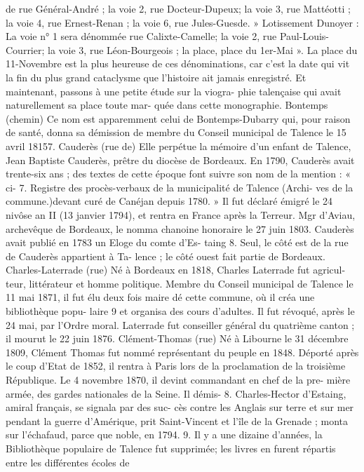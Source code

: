 \documentclass[a4paper,11pt]{book}
\begin{document}
de rue Général-André ; la voie 2, rue Docteur-Dupeux; la
voie 3, rue Mattéotti ; la voie 4, rue Ernest-Renan ; la voie
6, rue Jules-Guesde.
» Lotissement Dunoyer : La voie n° 1 sera dénommée
rue Calixte-Camelle; la voie 2, rue Paul-Louis-Courrier;
la voie 3, rue Léon-Bourgeois ; la place, place du 1er-Mai ».
La place du 11-Novembre est la plus heureuse de ces
dénominations, car c'est la date qui vit la fin du plus grand
cataclysme que l'histoire ait jamais enregistré.
Et maintenant, passons à une petite étude sur la viogra-
phie talençaise qui avait naturellement sa place toute mar-
quée dans cette monographie.
Bontemps (chemin)
Ce nom est apparemment celui de Bontemps-Dubarry
qui, pour raison de santé, donna sa démission de membre
du Conseil municipal de Talence le 15 avril 18157.
Cauderès (rue de)
Elle perpétue la mémoire d'un enfant de Talence, Jean
Baptiste Cauderès, prêtre du diocèse de Bordeaux.
En 1790, Cauderès avait trente-six ans ; des textes de
cette époque font suivre son nom de la mention : « ci-
7. Registre des procès-verbaux de la municipalité de Talence (Archi-
ves de la commune.)devant curé de Canéjan depuis 1780. » Il fut déclaré émigré
le 24 nivôse an II (13 janvier 1794), et rentra en France
après la Terreur. Mgr d'Aviau, archevêque de Bordeaux,
le nomma chanoine honoraire le 27 juin 1803.
Cauderès avait publié en 1783 un Eloge du comte d'Es-
taing 8.
Seul, le côté est de la rue de Cauderès appartient à Ta-
lence ; le côté ouest fait partie de Bordeaux.
Charles-Laterrade (rue)
Né à Bordeaux en 1818, Charles Laterrade fut agricul-
teur, littérateur et homme politique. Membre du Conseil
municipal de Talence le 11 mai 1871, il fut élu deux fois
maire dé cette commune, où il créa une bibliothèque popu-
laire 9 et organisa des cours d'adultes. Il fut révoqué, après
le 24 mai, par l'Ordre moral.
Laterrade fut conseiller général du quatrième canton ;
il mourut le 22 juin
1876.
Clément-Thomas (rue)
Né à Libourne le 31 décembre 1809, Clément Thomas fut
nommé représentant du peuple en 1848.
Déporté après le coup d'Etat de 1852, il rentra à Paris
lors de la proclamation de la troisième République. Le
4 novembre 1870, il devint commandant en chef de la pre-
mière armée, des gardes nationales de la Seine. Il démis-
8. Charles-Hector d'Estaing, amiral français, se signala par des suc-
cès contre les Anglais sur terre et sur mer pendant la guerre d'Amérique,
prit Saint-Vincent et l'île de la Grenade ; monta sur l'échafaud, parce que
noble, en 1794.
9. Il y a une dizaine d'années, la Bibliothèque populaire de Talence
fut supprimée; les livres en furent répartis entre les différentes écoles de
\end{document}
